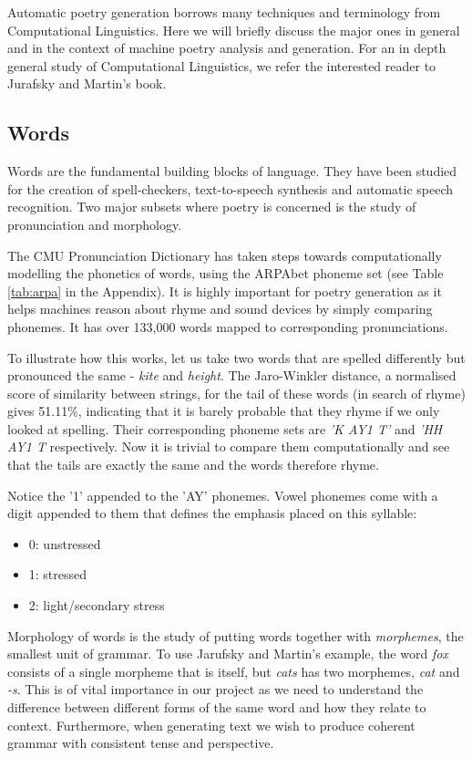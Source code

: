 Automatic poetry generation borrows many techniques and terminology from Computational Linguistics. Here we will briefly discuss the major ones in general and in the context of machine poetry analysis and generation. For an in depth general study of Computational Linguistics, we refer the interested reader to Jurafsky and Martin's book.

\subsection{Words}
\label{sec:words}
Words are the fundamental building blocks of language. They have been studied for the creation of spell-checkers, text-to-speech synthesis and automatic speech recognition. Two major subsets where poetry is concerned is the study of pronunciation and morphology. 

The CMU Pronunciation Dictionary\cite{weide1998cmu} has taken steps towards computationally modelling the phonetics of words, using the ARPAbet phoneme set (see Table \ref{tab:arpa} in the Appendix). It is highly important for poetry generation as it helps machines reason about rhyme and sound devices by simply comparing phonemes. It has over 133,000 words mapped to corresponding pronunciations.

To illustrate how this works, let us take two words that are spelled differently but pronounced the same - \textit{kite} and \textit{height}. The Jaro-Winkler distance, a normalised score of similarity between strings, for the tail of these words (in search of rhyme) gives 51.11\%, indicating that it is barely probable that they rhyme if we only looked at spelling. Their corresponding phoneme sets are \textit{'K AY1 T'} and \textit{'HH AY1 T} respectively. Now it is trivial to compare them computationally and see that the tails are exactly the same and the words therefore rhyme.

Notice the '1' appended to the 'AY' phonemes. Vowel phonemes come with a digit appended to them that defines the emphasis placed on this syllable:
\begin{itemize}
\item{0: unstressed}
\item{1: stressed}
\item{2: light/secondary stress}
\end{itemize}

Morphology of words is the study of putting words together with \textit{morphemes}, the smallest unit of grammar. To use Jarufsky and Martin's example, the word \textit{fox} consists of a single morpheme that is itself, but \textit{cats} has two morphemes, \textit{cat} and \textit{-s}. This is of vital importance in our project as we need to understand the difference between different forms of the same word and how they relate to context. Furthermore, when generating text we wish to produce coherent grammar with consistent tense and perspective.

